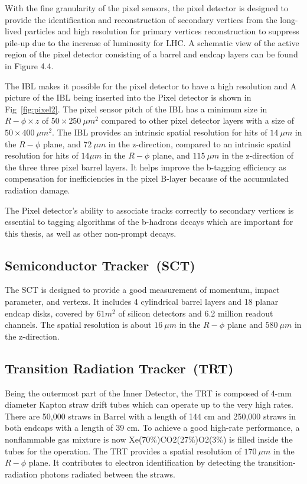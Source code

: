 \par  With the fine granularity of the pixel sensors, the pixel detector is designed to provide the identification and reconstruction of secondary vertices from the long-lived particles and high resolution for primary vertices reconstruction to suppress pile-up due to the increase of luminosity for LHC. A schematic view of the active region of the pixel detector consisting of a barrel and endcap layers can be found in Figure 4.4.
\par  The IBL makes it possible for the pixel detector to have a high resolution and A picture of the IBL being inserted into the Pixel detector is shown in 
Fig~\ref{fig:pixel2}.  The pixel sensor pitch of the IBL has a minimum size in $R-\phi \times z$ of $50 \times 250~\mu m^2$ compared to other pixel detector layers with a size of $50 \times 400~\mu m^2$. 	 The IBL provides an intrinsic spatial resolution for hits of $14~\mu m$ in the $R-\phi$ plane, and
$72~\mu m$ in the z-direction, compared to an intrinsic spatial resolution for hits of $14\mu m$ in the $R-\phi$ plane, and $115~\mu m$ in the z-direction of the three three pixel barrel layers.
It helps improve the b-tagging efficiency as compensation for inefficiencies in the pixel B-layer because of the accumulated radiation damage.
\par The Pixel detector's ability to associate tracks correctly to secondary vertices is essential to tagging algorithms of the b-hadrons decays which are important for this thesis, as well as other non-prompt decays.
\subsection{Semiconductor Tracker~(SCT)}
The SCT is designed to provide a good measurement of momentum, impact parameter, and vertexs. It includes 4 cylindrical barrel layers and 18 planar endcap disks, covered by $61 m^2$ of silicon detectors and 6.2 million readout channels. The spatial resolution is about $16~\mu m$ in the $R-\phi$ plane and $580~\mu m$ in the z-direction.

\subsection{Transition Radiation Tracker~(TRT)}

Being the outermost part of the Inner Detector,  the TRT is composed of 4-mm diameter Kapton straw drift tubes which can operate up to the very high rates. There are 50,000 straws in Barrel with a length of 144 cm and 250,000 straws in both endcaps with a length of 39 cm.
To achieve a good high-rate performance, a nonflammable gas mixture is now Xe(70\%)CO2(27\%)O2(3\%) is filled inside the tubes for the operation. The TRT provides a spatial resolution of  $170~\mu m$ in the $R-\phi$ plane. It contributes to electron identification by detecting the transition-radiation photons radiated between the straws. 


